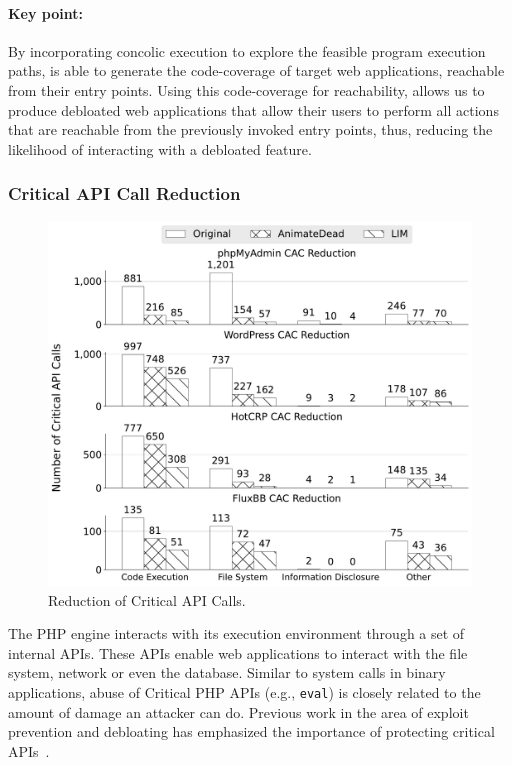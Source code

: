 {\paragraph{Key point:} 
By incorporating concolic execution to explore the feasible program execution paths, \animatedead{} is able to generate the code-coverage of target web applications, reachable from their entry points. 
Using this code-coverage for reachability, allows us to produce debloated web applications that allow their users to perform all actions that are reachable from the previously invoked entry points, thus, reducing the likelihood of interacting with a debloated feature. 

\subsubsection*{Critical API Call Reduction}

\begin{figure}[t]
    \centering
    \includegraphics[width=0.8\linewidth]{figures/ad/cac_reduction_bw.pdf}
    \caption{Reduction of Critical API Calls.}
    \label{fig:cac_reduction}
\end{figure}

The PHP engine interacts with its execution environment through a set of internal APIs. 
These APIs enable web applications to interact with the file system, network or even the database. 
Similar to system calls in binary applications, abuse of Critical PHP APIs (e.g., \texttt{eval}) is closely related to the amount of damage an attacker can do. 
Previous work in the area of exploit prevention and debloating has emphasized the importance of protecting critical APIs~\cite{Mishra2018, pappas2012kbouncer, fratric2012ropguard, bulekov2021saphire}. 

}
